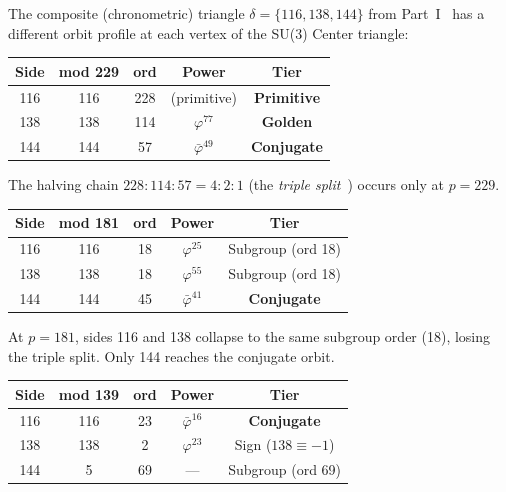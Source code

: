 The composite (chronometric) triangle $\delta = \{116, 138, 144\}$
from Part~I~\cite{dwm_fst} has a different orbit profile at each
vertex of the SU(3) Center triangle:

\begin{center}
\begin{tabular}{@{}ccccc@{}}
\toprule
Side & mod 229 & ord & Power & Tier \\
\midrule
116 & 116 & 228 & (primitive) & \textbf{Primitive} \\
138 & 138 & 114 & $\varphi^{77}$ & \textbf{Golden} \\
144 & 144 &  57 & $\bar\varphi^{49}$ & \textbf{Conjugate} \\
\bottomrule
\end{tabular}
\end{center}

The halving chain $228 : 114 : 57 = 4 : 2 : 1$ (the
\emph{triple split}~\cite{dwm_fst})
occurs only at $p = 229$.

\begin{center}
\begin{tabular}{@{}ccccc@{}}
\toprule
Side & mod 181 & ord & Power & Tier \\
\midrule
116 & 116 & 18 & $\varphi^{25}$ & Subgroup (ord 18) \\
138 & 138 & 18 & $\varphi^{55}$ & Subgroup (ord 18) \\
144 & 144 & 45 & $\bar\varphi^{41}$ & \textbf{Conjugate} \\
\bottomrule
\end{tabular}
\end{center}

At $p = 181$, sides 116 and 138 collapse to the same subgroup order (18),
losing the triple split. Only 144 reaches the conjugate orbit.

\begin{center}
\begin{tabular}{@{}ccccc@{}}
\toprule
Side & mod 139 & ord & Power & Tier \\
\midrule
116 & 116 & 23 & $\bar\varphi^{16}$ & \textbf{Conjugate} \\
138 & 138 &  2 & $\varphi^{23}$ & Sign ($138 \equiv -1$) \\
144 &   5 & 69 & --- & Subgroup (ord 69) \\
\bottomrule
\end{tabular}
\end{center}

